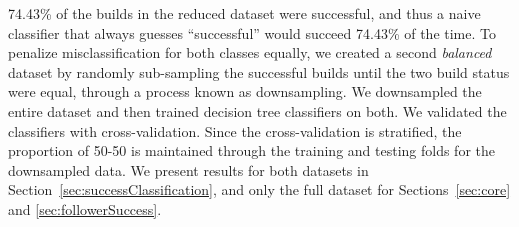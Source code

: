 \documentclass[10pt, conference]{IEEEtran}
\begin{document}
74.43\% of the builds in the reduced dataset were successful, and thus a naive
classifier that always guesses ``successful'' would succeed 74.43\% of the time.
To penalize misclassification for
both classes equally, we created a second \emph{balanced} dataset by randomly 
sub-sampling the successful builds until the two build status were
equal, through a process known as downsampling. We downsampled the entire
dataset and then trained decision tree classifiers on both.  We validated the
classifiers with cross-validation. Since the cross-validation is stratified, the
proportion of 50-50 is maintained through the training and testing folds for the
downsampled data. We present results for both
datasets in Section~\ref{sec:successClassification},  and only the full dataset for Sections~\ref{sec:core} and \ref{sec:followerSuccess}.
\end{document}
